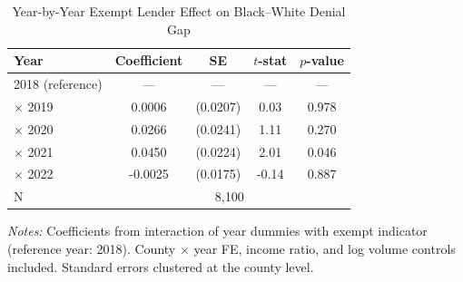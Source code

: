 \begin{table}[H]
\centering
\caption{Year-by-Year Exempt Lender Effect on Black--White Denial Gap}
\label{tab:event}
\begin{threeparttable}
\begin{tabular}{lcccc}
\toprule
Year & Coefficient & SE & $t$-stat & $p$-value \\
\midrule
2018 (reference) & --- & --- & --- & --- \\
 $\times$ 2019 & 0.0006 & (0.0207) & 0.03 & 0.978 \\
 $\times$ 2020 & 0.0266 & (0.0241) & 1.11 & 0.270 \\
 $\times$ 2021 & 0.0450 & (0.0224) & 2.01 & 0.046 \\
 $\times$ 2022 & -0.0025 & (0.0175) & -0.14 & 0.887 \\
\midrule
N & \multicolumn{4}{c}{8,100} \\
\bottomrule
\end{tabular}
\begin{tablenotes}[flushleft]\small
\item \textit{Notes:} Coefficients from interaction of year dummies with exempt indicator (reference year: 2018). County $\times$ year FE, income ratio, and log volume controls included. Standard errors clustered at the county level.
\end{tablenotes}
\end{threeparttable}
\end{table}
